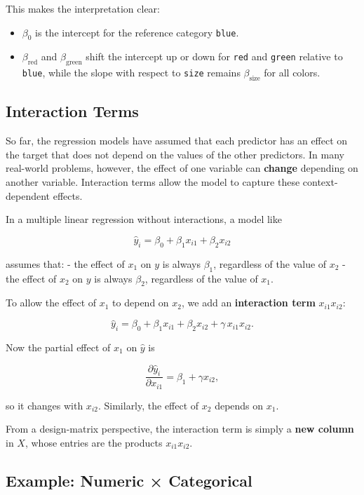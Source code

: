 This makes the interpretation clear:
\begin{itemize}
  \item $\beta_0$ is the intercept for the reference category \texttt{blue}.
  \item $\beta_{\text{red}}$ and $\beta_{\text{green}}$ shift the intercept up or down for \texttt{red} and \texttt{green} relative to \texttt{blue}, while the slope with respect to \texttt{size} remains $\beta_{\text{size}}$ for all colors.
\end{itemize}


\subsection{Interaction Terms}

So far, the regression models have assumed that each predictor has an effect on the target that does not depend on the values of the other predictors. In many real-world problems, however, the effect of one variable can \textbf{change} depending on another variable. Interaction terms allow the model to capture these context-dependent effects.

In a multiple linear regression without interactions, a model like

\[
\hat{y}_i = \beta_0 + \beta_1 x_{i1} + \beta_2 x_{i2}
\]

assumes that:
- the effect of $x_1$ on $y$ is always $\beta_1$, regardless of the value of $x_2$  
- the effect of $x_2$ on $y$ is always $\beta_2$, regardless of the value of $x_1$.

To allow the effect of $x_1$ to depend on $x_2$, we add an \textbf{interaction term} $x_{i1} x_{i2}$:

\[
\hat{y}_i = \beta_0 + \beta_1 x_{i1} + \beta_2 x_{i2} + \gamma\, x_{i1} x_{i2}.
\]

Now the partial effect of $x_1$ on $\hat{y}$ is

\[
\frac{\partial \hat{y}_i}{\partial x_{i1}} = \beta_1 + \gamma x_{i2},
\]

so it changes with $x_{i2}$. Similarly, the effect of $x_2$ depends on $x_1$.

From a design-matrix perspective, the interaction term is simply a \textbf{new column} in $X$, whose entries are the products $x_{i1} x_{i2}$.

\subsection{Example: Numeric × Categorical}

